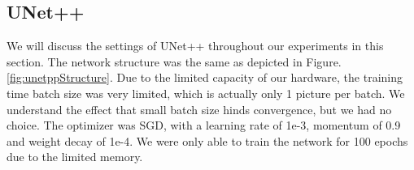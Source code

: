 \subsection{UNet++}
We will discuss the settings of UNet++ throughout our experiments in this section. The network structure was the same as depicted in Figure.\ref{fig:unetppStructure}. Due to the limited capacity of our hardware, the training time batch size was very limited, which is actually only 1 picture per batch. We understand the effect that small batch size hinds convergence, but we had no choice. The optimizer was SGD, with a learning rate of 1e-3, momentum of 0.9 and weight decay of 1e-4. We were only able to train the network for 100 epochs due to the limited memory.

